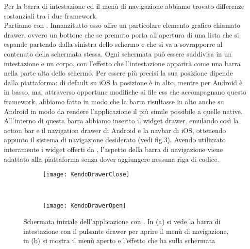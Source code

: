			Per la barra di intestazione ed il menù di navigazione abbiamo trovato 
			differenze sostanziali tra i due framework.\\
			Partiamo con \kendomob{}.
			Innanzitutto esso offre un particolare elemento grafico chiamato drawer, 
			ovvero un bottone che se premuto porta all'apertura di 
			una lista che si espande partendo dalla sinistra dello schermo e che 
			si va a sovrapporre al contenuto della schermata stessa.
			Ogni schermata può essere suddivisa in un intestazione e un corpo, 
			con l'effetto che l'intestazione apparirà come una barra nella parte alta 
			dello schermo. Per essere più precisi la sua posizione dipende dalla
			piattaforma: di default su iOS la posizione è in alto, mentre per Android 
			è in basso, ma, attraverso opportune modifiche ai file css che accompagnano 
			questo framework, abbiamo fatto in modo che la barra risultasse in alto 
			anche su Android in modo da rendere l'applicazione il più simile possibile 
			a quelle native.
			All'interno di questa barra abbiamo inserito il widget drawer, emulando 
			così la action bar e il navigation drawer di Android e la navbar di iOS,
			ottenendo appunto il sistema di navigazione desiderato (vedi fig.\ref{fig:kendodrawer}).
			Avendo utilizzato interamente i widget offerti da \kendomob{}, l'aspetto 
			della barra di navigazione viene adattato alla piattaforma senza 
			dover aggiungere nessuna riga di codice.
			\begin{figure}[h]
				\centering
				\begin{subfigure}[b]{0.485\textwidth}
					\texttt{[image: KendoDrawerClose]}
					\caption{}
					\label{fig:kendoDrawerClose}
				\end{subfigure}
				~
				\begin{subfigure}[b]{0.485\textwidth}
					\texttt{[image: KendoDrawerOpen]}
					\caption{}
					\label{fig:kendoDrawerOpen}
				\end{subfigure}
				\caption{Schermata iniziale dell'applicazione con \kendomob{}. 
				In (a) si vede la barra di intestazione con il pulsante drawer 
				per aprire il menù di navigazione, in (b) si mostra il menù aperto 
				e l'effetto che ha sulla schermata}
				\label{fig:kendodrawer}
			\end{figure}
		
